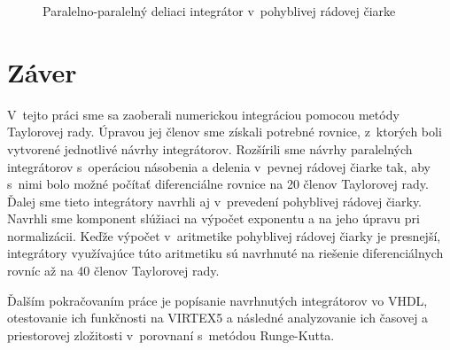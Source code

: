 \begin{figure}[h]
\centering
{}
\caption{Paralelno-paralelný deliaci integrátor v~pohyblivej rádovej čiarke}
\label{ppdi_fp}
\end{figure}
\bigskip



\chapter{Záver}
V~tejto práci sme sa zaoberali numerickou integráciou pomocou metódy Taylorovej rady. Úpravou jej členov sme získali potrebné rovnice, z~ktorých boli vytvorené jednotlivé návrhy integrátorov.
Rozšírili sme návrhy paralelných integrátorov s~operáciou násobenia a delenia v~pevnej rádovej čiarke tak, aby s~nimi bolo možné počítať diferenciálne rovnice na 20 členov Taylorovej rady. Ďalej sme tieto integrátory navrhli aj v~prevedení pohyblivej rádovej čiarky. Navrhli sme komponent slúžiaci na výpočet exponentu a na jeho úpravu pri normalizácii. Keďže výpočet v~aritmetike pohyblivej rádovej čiarky je presnejší, integrátory využívajúce túto aritmetiku sú navrhnuté na riešenie diferenciálnych rovníc až na 40 členov Taylorovej rady.

Ďalším pokračovaním práce je popísanie navrhnutých integrátorov vo VHDL, otestovanie ich funkčnosti na VIRTEX5 a následné analyzovanie ich časovej a priestorovej zložitosti v~porovnaní s~metódou Runge-Kutta.

